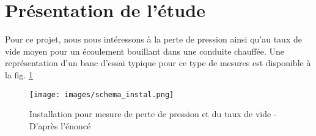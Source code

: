\section{Présentation de l'étude\label{section:pres}}

Pour ce projet, nous nous intéressons à la perte de pression ainsi qu'au taux de vide moyen pour un écoulement bouillant dans une conduite chauffée. Une représentation d'un banc d'essai typique pour ce type de mesures est disponible à la fig. \ref{fig:instal}

\begin{figure}[htbp]
    \centering
    \texttt{[image: images/schema\_instal.png]}
    \caption{Installation pour mesure de perte de pression et du taux de vide - D'après l'énoncé}
    \label{fig:instal}
\end{figure}


